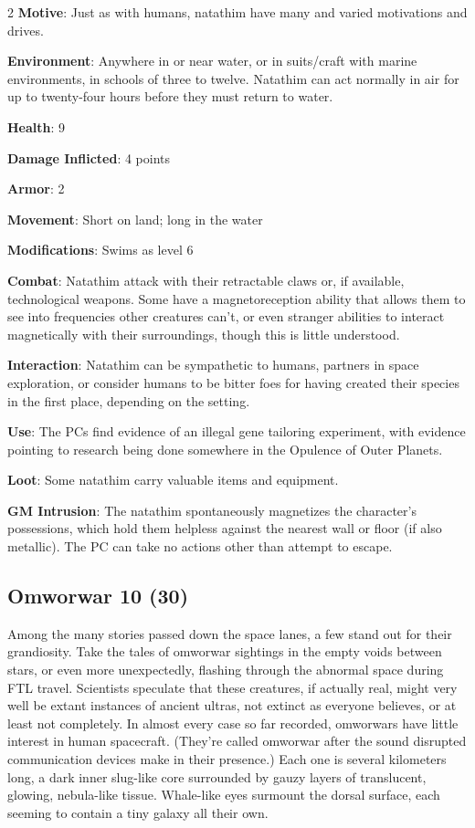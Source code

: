 \begin{multicols}{2}
\textbf{Motive}: Just as with humans, natathim have many and varied motivations and drives. 

\textbf{Environment}: Anywhere in or near water, or in suits/craft with marine environments, in schools of three to twelve. Natathim can act normally in air for up to twenty-four hours before they must return to water. 

\textbf{Health}: 9 

\textbf{Damage Inflicted}:  4 points 

\textbf{Armor}: 2 

\textbf{Movement}: Short on land; long in the water 

\textbf{Modifications}: Swims as level 6 

\textbf{Combat}: Natathim attack with their retractable claws or, if available, technological weapons. Some have a magnetoreception ability that allows them to see into frequencies other creatures can’t, or even stranger abilities to interact magnetically with their surroundings, though this is little understood. 

\textbf{Interaction}: Natathim can be sympathetic to humans, partners in space exploration, or consider humans to be bitter foes for having created their species in the first place, depending on the setting. 

\textbf{Use}: The PCs find evidence of an illegal gene tailoring experiment, with evidence pointing to research being done somewhere in the Opulence of Outer Planets. 

\textbf{Loot}: Some natathim carry valuable items and equipment.

\textbf{GM Intrusion}: The natathim spontaneously magnetizes the character’s possessions, which hold them helpless against the nearest wall or floor (if also metallic). The PC can take no actions other than attempt to escape.

\subsection{Omworwar 10 (30)}

Among the many stories passed down the space lanes, a few stand out for their grandiosity. Take the tales of omworwar sightings in the empty voids between stars, or even more unexpectedly, flashing through the abnormal space during FTL travel. Scientists speculate that these creatures, if actually real, might very well be extant instances of ancient ultras, not extinct as everyone believes, or at least not completely. In almost every case so far recorded, omworwars have little interest in human spacecraft. (They’re called omworwar after the sound disrupted communication devices make in their presence.) Each one is several kilometers long, a dark inner slug-like core surrounded by gauzy layers of translucent, glowing, nebula-like tissue. Whale-like eyes surmount the dorsal surface, each seeming to contain a tiny galaxy all their own. 


\end{multicols}
